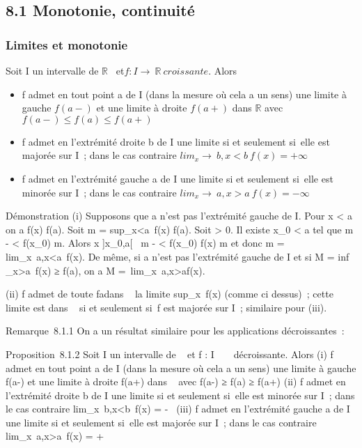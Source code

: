 \subsection{8.1 Monotonie, continuité}

\subsubsection{Limites et monotonie}
\label{sec:limites-et-monotonie}



\begin{prop}
Soit I un intervalle de $\mathbb{R}$~ et$ f : I \rightarrow~ \mathbb{R}~ croissante$.
Alors

\begin{itemize}

\item
f admet en tout point a de I (dans la mesure où cela a un sens)
  une limite à gauche $f(a-)$ et une limite à droite $ f(a+)$ dans $\mathbb{R}$ avec
  $f(a-) \leq f(a) \leq f(a+)$
\item
f admet en l'extrémité droite b de I une limite si et seulement
  si~elle est majorée sur I~; dans le cas contraire
 $ lim_x\rightarrow~b,x<b~f(x) = +\infty~$
\item
f admet en l'extrémité gauche a de I une limite si et seulement
  si~elle est minorée sur I~; dans le cas contraire
$lim_x \rightarrow ~a, x >a~f(x) = -\infty~$
\end{itemize}
  
\end{prop}

Démonstration (i) Supposons que a n'est pas l'extrémité gauche de I.
Pour x < a on a f(x) \leq f(a). Soit m
= sup_x<a~f(x) \leq f(a). Soit
\epsilon > 0. Il existe x_0 < a tel que m - \epsilon
< f(x_0) \leq m. Alors x \in]x_0,a[\rigtharrow~ m - \epsilon
< f(x_0) \leq f(x) \leq m et donc m
= lim_x\rightarrow~a,x<a~f(x). De même,
si a n'est pas l'extrémité gauche de I et si M
= inf _x>a~f(x) ≥ f(a),
on a M =\
lim_x\rightarrow~a,x>af(x).

(ii) f admet de toute fa\ccon dans
\overline{}~ la limite
sup_x\inI~f(x) (comme ci dessus)~; cette
limite est dans \mathbb{R}~ si et seulement si~f est majorée sur I~; similaire
pour (iii).

Remarque~8.1.1 On a un résultat similaire pour les applications
décroissantes~:

Proposition~8.1.2 Soit I un intervalle de ~ et f : I \rightarrow~ ~ décroissante.
Alors (i) f admet en tout point a de I (dans la mesure où cela a un
sens) une limite à gauche f(a-) et une limite à droite f(a+) dans ~ avec
f(a-) ≥ f(a) ≥ f(a+) (ii) f admet en l'extrémité droite b de I une
limite si et seulement si~elle est minorée sur I~; dans le cas contraire
lim_x\rightarrow~b,x<b~f(x) = -\infty~ (iii)
f admet en l'extrémité gauche a de I une limite si et seulement si~elle
est majorée sur I~; dans le cas contraire
lim_x\rightarrow~a,x>a~f(x) = +\infty~

